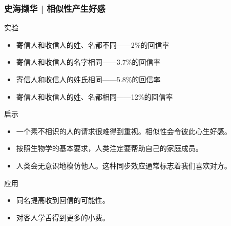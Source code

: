 \begin{frame}
  \frametitle{史海撷华 | 相似性产生好感}
  \begin{block}{实验}
    \begin{itemize}
      \item 寄信人和收信人的姓、名都不同——2\%的回信率
      \item 寄信人和收信人的名字相同——3.7\%的回信率
      \item 寄信人和收信人的姓氏相同——5.8\%的回信率
      \item 寄信人和收信人的姓、名都相同——12\%的回信率
    \end{itemize}
  \end{block}
  \vspace{-0.5em}
  \pause
  \begin{block}{启示}
    \begin{itemize}
      \item 一个素不相识的人的请求很难得到重视。相似性会令彼此心生好感。
      \item 按照生物学的基本要求，人类注定要帮助自己的家庭成员。
      \item 人类会无意识地模仿他人。这种同步效应通常标志着我们喜欢对方。
    \end{itemize}
  \end{block}
  \vspace{-0.5em}
  \pause
  \begin{block}{应用}
    \begin{itemize}
      \item 同名提高收到回信的可能性。
      \item 对客人学舌得到更多的小费。
    \end{itemize}
  \end{block}
\end{frame}

